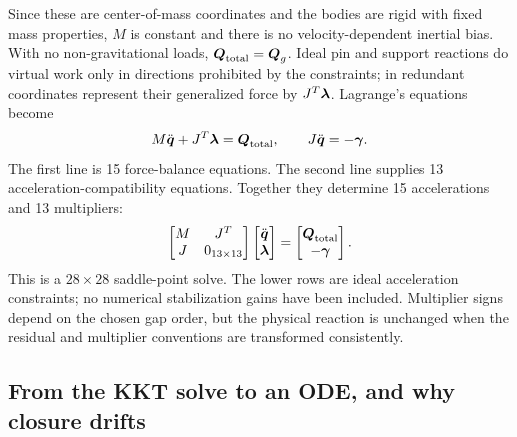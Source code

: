 \documentclass[../main.tex]{subfiles}
\begin{document}
	Since these are center-of-mass coordinates and the bodies are rigid with fixed mass properties, $M$ is constant and there is no velocity-dependent inertial bias. With no non-gravitational loads, $\boldsymbol{Q}_{\mathrm{total}}=\boldsymbol{Q}_g$. Ideal pin and support reactions do virtual work only in directions prohibited by the constraints; in redundant coordinates represent their generalized force by $J^T\boldsymbol{\lambda}$. Lagrange's equations become
	\begin{equation}
	M\ddot{\boldsymbol{q}}+J^T\boldsymbol{\lambda}=\boldsymbol{Q}_{\mathrm{total}},
	\qquad
	J\ddot{\boldsymbol{q}}=-\boldsymbol{\gamma}.
	\label{eq:five-link-ideal-equations-ch4}
	\end{equation}
	The first line is 15 force-balance equations. The second line supplies 13 acceleration-compatibility equations. Together they determine 15 accelerations and 13 multipliers:
	\begin{equation}
	\begin{bmatrix}M&J^T\\J&0_{13\times13}\end{bmatrix}
	\begin{bmatrix}\ddot{\boldsymbol{q}}\\\boldsymbol{\lambda}\end{bmatrix}
	=\begin{bmatrix}\boldsymbol{Q}_{\mathrm{total}}\\-\boldsymbol{\gamma}\end{bmatrix}.
	\label{eq:five-link-kkt-ch4}
	\end{equation}
	This is a $28\times28$ saddle-point solve. The lower rows are ideal acceleration constraints; no numerical stabilization gains have been included. Multiplier signs depend on the chosen gap order, but the physical reaction is unchanged when the residual and multiplier conventions are transformed consistently.

	\subsection{From the KKT solve to an ODE, and why closure drifts}
\end{document}
